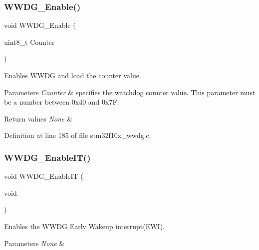 \subsubsection{\texorpdfstring{W\+W\+D\+G\+\_\+\+Enable()}{WWDG\_Enable()}}
{\footnotesize\ttfamily void W\+W\+D\+G\+\_\+\+Enable (\begin{DoxyParamCaption}\item[{uint8\+\_\+t}]{Counter }\end{DoxyParamCaption})}



Enables W\+W\+DG and load the counter value. 


\begin{DoxyParams}{Parameters}
{\em Counter} & specifies the watchdog counter value. This parameter must be a number between 0x40 and 0x7F. \\
\hline
\end{DoxyParams}

\begin{DoxyRetVals}{Return values}
{\em None} & \\
\hline
\end{DoxyRetVals}


Definition at line 185 of file stm32f10x\+\_\+wwdg.\+c.

\mbox{\label{group___w_w_d_g___exported___functions_gac8af66ea5254d3d78b60b9b7c7f29521}} 
\subsubsection{\texorpdfstring{W\+W\+D\+G\+\_\+\+Enable\+I\+T()}{WWDG\_EnableIT()}}
{\footnotesize\ttfamily void W\+W\+D\+G\+\_\+\+Enable\+IT (\begin{DoxyParamCaption}\item[{void}]{ }\end{DoxyParamCaption})}



Enables the W\+W\+DG Early Wakeup interrupt(\+E\+W\+I). 


\begin{DoxyParams}{Parameters}
{\em None} & \\
\hline
\end{DoxyParams}

